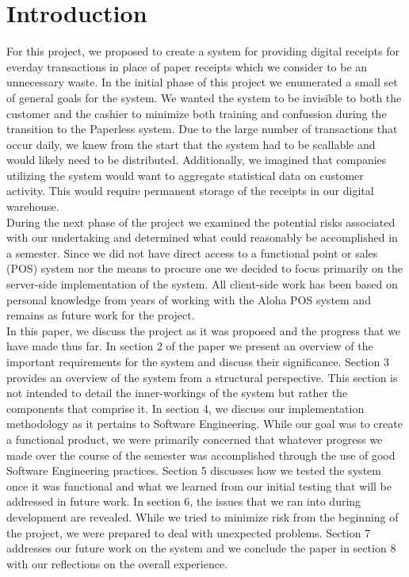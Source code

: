 \section{Introduction}
For this project, we proposed to create a system for providing digital receipts for everday transactions in place of paper receipts which we consider to be an unnecessary waste.  In the initial phase of this project we enumerated a small set of general goals for the system.  We wanted the system to be invisible to both the customer and the cashier to minimize both training and confussion during the transition to the Paperless system.  Due to the large number of transactions that occur daily, we knew from the start that the system had to be scallable and would likely need to be distributed.  Additionally, we imagined that companies utilizing the system would want to aggregate statistical data on customer activity.  This would require permanent storage of the receipts in our digital warehouse.\\
During the next phase of the project we examined the potential risks associated with our undertaking and determined what could reasonably be accomplished in a semester.  Since we did not have direct access to a functional point or sales (POS) system nor the means to procure one we decided to focus primarily on the server-side implementation of the system.  All client-side work has been based on personal knowledge from years of working with the Aloha POS system and remains as future work for the project.\\
In this paper, we discuss the project as it was proposed and the progress that we have made thus far.  In section 2 of the paper we present an overview of the important requirements for the system and discuss their significance.  Section 3 provides an overview of the system from a structural perspective.  This section is not intended to detail the inner-workings of the system but rather the components that comprise it.  In section 4, we discuss our implementation methodology as it pertains to Software Engineering.  While our goal was to create a functional product, we were primarily concerned that whatever progress we made over the course of the semester was accomplished through the use of good Software Engineering practices.  Section 5 discusses how we tested the system once it was functional and what we learned from our initial testing that will be addressed in future work.  In section 6, the issues that we ran into during development are revealed.  While we tried to minimize risk from the beginning of the project, we were prepared to deal with unexpected problems.  Section 7 addresses our future work on the system and we conclude the paper in section 8 with our reflections on the overall experience.
